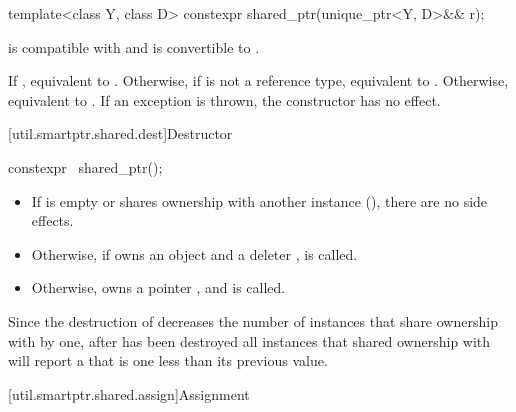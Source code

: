 %
%
\begin{itemdecl}
template<class Y, class D> constexpr shared_ptr(unique_ptr<Y, D>&& r);
\end{itemdecl}

\begin{itemdescr}
\pnum
\constraints
{} is compatible with  and
 is convertible to .

\pnum
\effects
If , equivalent to .
Otherwise, if  is not a reference type,
equivalent to .
Otherwise, equivalent to .
If an exception is thrown, the constructor has no effect.
\end{itemdescr}

[util.smartptr.shared.dest]{Destructor}

%
\begin{itemdecl}
constexpr ~shared_ptr();
\end{itemdecl}

\begin{itemdescr}
\pnum
\effects
\begin{itemize}
\item If  is empty or shares ownership with another
 instance (), there are no side effects.

\item
Otherwise, if  owns an object
 and a deleter ,  is called.

\item Otherwise,  owns a pointer ,
and  is called.
\end{itemize}
\end{itemdescr}

\pnum
\begin{note}
Since the destruction of 
decreases the number of instances that share ownership with 
by one,
after  has been destroyed
all  instances that shared ownership with
 will report a  that is one less
than its previous value.
\end{note}

[util.smartptr.shared.assign]{Assignment}

